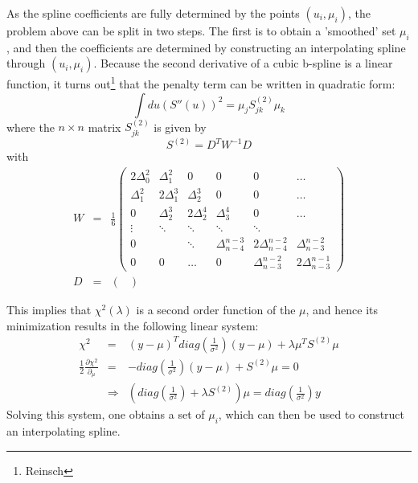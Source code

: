 \documentclass[a4paper,10pt,twosided]{article}
\begin{document}
As the spline coefficients are fully determined by the points $(u_i,\mu_i)$, the problem above can be
split in two steps. The first is to obtain a 'smoothed' set $\mu_i$, and then the coefficients are determined
by constructing an interpolating spline through $(u_i,\mu_i)$.
Because the second derivative of a cubic b-spline is a linear function, it turns out\footnote{Reinsch} that 
the penalty term can be written in quadratic form:
\begin{equation}
    \int du (S''(u))^2 = \mu_j S^{(2)}_{jk} \mu_k
\end{equation}
where the $n\times n$ matrix $S^{(2)}_{jk}$ is given by 
\begin{equation}
    S^{(2)} = D^T W^{-1} D
\end{equation}
with
\begin{eqnarray}
    W &=&\frac{1}{6} \left( \begin{array}{ccccccc}  
               2 \Delta^2_0  &  \Delta^2_1 & 0 & 0 & 0& \hdots
             \\ \Delta^2_1   & 2\Delta^3_1 &  \Delta^3_2 & 0 &0&  \hdots
             \\ 0  & \Delta^3_2   &2\Delta^4_2 &  \Delta^4_3 &0&  \hdots
             \\ \vdots  &  \ddots  & \ddots & \ddots & \ddots &  
             \\ 0  &  &  \ddots  & \Delta_{n-4}^{n-3} & 2\Delta_{n-4}^{n-2} & \Delta_{n-3}^{n-2}
             \\ 0 & 0& \hdots & 0 & \Delta_{n-3}^{n-2} & 2\Delta_{n-3}^{n-1}
        \end{array} \right)
\\  D &=& \left( \begin{array}{ccccccc}  
        \end{array} \right)
\end{eqnarray}


This implies that $\chi^2(\lambda)$ is a second order function of the $\mu$, and hence its minimization
results in the following linear system:
\begin{eqnarray}
    \chi^2 & = & (y-\mu)^T diag(\frac{1}{\sigma^2}) (y-\mu) + \lambda \mu^T S^{(2)} \mu
\\  \frac{1}{2}\frac{\partial \chi^2}{\partial_\mu } &=& -diag(\frac{1}{\sigma^2}) (y-\mu) + S^{(2)}\mu = 0
\\    &\Rightarrow & \left( diag(\frac{1}{\sigma^2})  + \lambda S^{(2)}\right)   \mu = diag(\frac{1}{\sigma^2}) y
\end{eqnarray}
Solving this system, one obtains a set of $\mu_i$, which can then be used to construct an interpolating 
spline.
\end{document}
